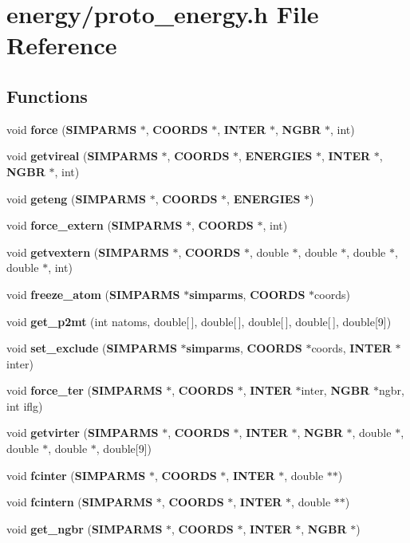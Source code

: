 \section{energy/proto\_\-energy.h File Reference}
\label{energy_2proto__energy_8h}
\subsection*{Functions}
\begin{CompactItemize}
\item 
void {\bf force} ({\bf SIMPARMS} $\ast$, {\bf COORDS} $\ast$, {\bf INTER} $\ast$, {\bf NGBR} $\ast$, int)
\item 
void {\bf getvireal} ({\bf SIMPARMS} $\ast$, {\bf COORDS} $\ast$, {\bf ENERGIES} $\ast$, {\bf INTER} $\ast$, {\bf NGBR} $\ast$, int)
\item 
void {\bf geteng} ({\bf SIMPARMS} $\ast$, {\bf COORDS} $\ast$, {\bf ENERGIES} $\ast$)
\item 
void {\bf force\_\-extern} ({\bf SIMPARMS} $\ast$, {\bf COORDS} $\ast$, int)
\item 
void {\bf getvextern} ({\bf SIMPARMS} $\ast$, {\bf COORDS} $\ast$, double $\ast$, double $\ast$, double $\ast$, double $\ast$, int)
\item 
void {\bf freeze\_\-atom} ({\bf SIMPARMS} $\ast${\bf simparms}, {\bf COORDS} $\ast$coords)
\item 
void {\bf get\_\-p2mt} (int natoms, double[$\,$], double[$\,$], double[$\,$], double[$\,$], double[9])
\item 
void {\bf set\_\-exclude} ({\bf SIMPARMS} $\ast${\bf simparms}, {\bf COORDS} $\ast$coords, {\bf INTER} $\ast$inter)
\item 
void {\bf force\_\-ter} ({\bf SIMPARMS} $\ast$, {\bf COORDS} $\ast$, {\bf INTER} $\ast$inter, {\bf NGBR} $\ast$ngbr, int iflg)
\item 
void {\bf getvirter} ({\bf SIMPARMS} $\ast$, {\bf COORDS} $\ast$, {\bf INTER} $\ast$, {\bf NGBR} $\ast$, double $\ast$, double $\ast$, double $\ast$, double[9])
\item 
void {\bf fcinter} ({\bf SIMPARMS} $\ast$, {\bf COORDS} $\ast$, {\bf INTER} $\ast$, double $\ast$$\ast$)
\item 
void {\bf fcintern} ({\bf SIMPARMS} $\ast$, {\bf COORDS} $\ast$, {\bf INTER} $\ast$, double $\ast$$\ast$)
\item 
void {\bf get\_\-ngbr} ({\bf SIMPARMS} $\ast$, {\bf COORDS} $\ast$, {\bf INTER} $\ast$, {\bf NGBR} $\ast$)

\end{CompactItemize}

